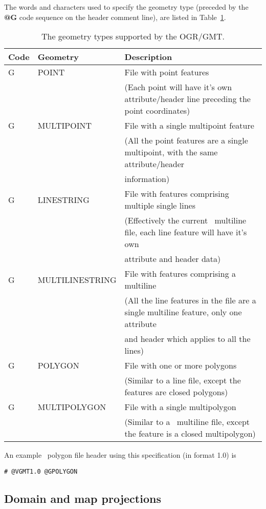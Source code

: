 The words and characters used to specify the geometry type
(preceded by the \textbf{@G} code sequence on
the header comment line), are listed in Table~\ref{tbl:geometries}.
\begin{table}[h]
\small
\centering
\begin{tabular}{lll} \hline
\textbf{Code}	&	\textbf{Geometry}	&	\textbf{Description} \\ \hline \hline
G	&	POINT		&	File with point features \\
	&			&	(Each point will have it's own attribute/header line preceding the point coordinates) \\
G	&	MULTIPOINT	&	File with a single multipoint feature \\
	&			&	(All the point features are a single multipoint, with the same attribute/header \\
	&			&	information) \\
G	&	LINESTRING	&	File with features comprising multiple single lines  \\
	&			&	(Effectively the current \GMT\ multiline file, each line feature will have it's own  \\ 
	&			&	attribute and header data) \\
G	&	MULTILINESTRING	&	File with features comprising a multiline \\
	&			&	(All the line features in the file are a single multiline feature, only one attribute\\
	&			&	and header which applies to all the lines) \\
G	&	POLYGON		&	File with one or more polygons \\
	&			&	(Similar to a line file, except the features are closed polygons) \\
G	&	MULTIPOLYGON	&	File with a single multipolygon \\
	&			&	(Similar to a \GMT\ multiline file, except the feature is a closed multipolygon) \\ \hline
\end{tabular}
\label{tbl:geometries}
\caption{The geometry types supported by the OGR/GMT.}
\end{table} 
An example \GMT\ polygon file header using this specification (in format 1.0) is

\begin{verbatim}
# @VGMT1.0 @GPOLYGON
\end{verbatim}

\subsection{Domain and map projections}

